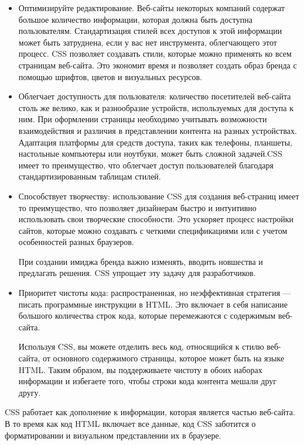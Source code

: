 \begin{itemize}
\item Оптимизируйте редактирование. Веб-сайты некоторых компаний содержат большое количество информации, которая должна быть доступна пользователям. Стандартизация стилей всех доступов к этой информации может быть затруднена, если у вас нет инструмента, облегчающего этот процесс. CSS позволяет создавать стили, которые можно применять ко всем страницам веб-сайта. Это экономит время и позволяет создать образ бренда с помощью шрифтов, цветов и визуальных ресурсов.

\item Облегчает доступность для пользователя: количество посетителей веб-сайта столь же велико, как и разнообразие устройств, используемых для доступа к ним. При оформлении страницы необходимо учитывать возможности взаимодействия и различия в представлении контента на разных устройствах. Адаптация платформы для средств доступа, таких как телефоны, планшеты, настольные компьютеры или ноутбуки, может быть сложной задачей.CSS имеет то преимущество, что облегчает доступ пользователей благодаря стандартизированным таблицам стилей.

\item Способствует творчеству: использование CSS для создания веб-страниц имеет то преимущество, что позволяет дизайнерам быстро и интуитивно использовать свои творческие способности. Это ускоряет процесс настройки сайтов, которые можно создавать с четкими спецификациями или с учетом особенностей разных браузеров.

При создании имиджа бренда важно изменять, вводить новшества и предлагать решения. CSS упрощает эту задачу для разработчиков.

\item Приоритет чистоты кода: распространенная, но неэффективная стратегия — писать программные инструкции в HTML. Это включает в себя написание большого количества строк кода, которые перемежаются с содержимым веб-сайта.

Используя CSS, вы можете отделить весь код, относящийся к стилю веб-сайта, от основного содержимого страницы, которое может быть на языке HTML. Таким образом, вы поддерживаете чистоту в обоих наборах информации и избегаете того, чтобы строки кода контента мешали друг другу.
\end{itemize}

CSS работает как дополнение к информации, которая является частью веб-сайта. В то время как код HTML включает все данные, код CSS заботится о форматировании и визуальном представлении их в браузере.

